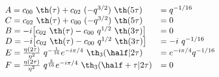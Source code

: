 \begin{equation}\label{NS-special-bis}
  \begin{array}{lll}
A = c_{00}~\th(\tau) +c_{02}~(-q^{3/2})~\th(5\tau) &=q^{-1/16}\\ 
C = c_{02}~\th(\tau) +c_{00}~(-q^{3/2})~\th(5\tau)&= 0\\ 
B = -i \big[c_{02}~\th(\tau) -c_{00} ~q^{1/2}~\th(3\tau) \big] &= 0\\ 
D = -i \big[c_{02}~\th(\tau) -c_{00}~q^{1/2}~\th(3\tau) \big] &=-i~q^{-1/16}\\ 
E = {\eta(2\tau)\over\eta^2} ~q^{-{1\over 16}} e^{-i\pi /4}
~\th_3(\half|2\tau) &=  e^{-i\pi /4} q^{-1/16} \\ 
F = {\eta(2\tau)\over\eta^2} ~q^{3\over 16} e^{-i\pi /4}
~\th_3(\half+\tau|2\tau) &= 0
  \end{array}
\end{equation}

